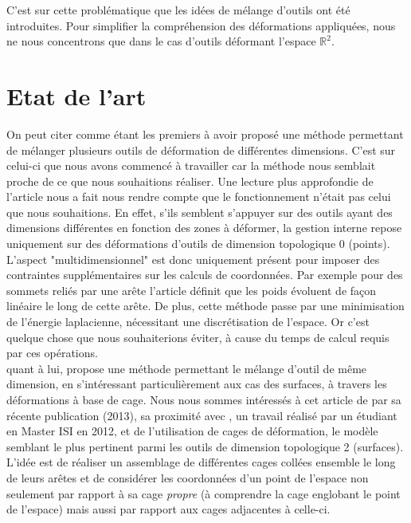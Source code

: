 C'est sur cette problématique que les idées de mélange d'outils ont
été introduites. Pour simplifier la compréhension des déformations
appliquées, nous ne nous concentrons que dans le cas d'outils
déformant l'espace $\mathbb{R}^2$.

\section{Etat de l'art}

On peut citer \cite{JBPS11} comme étant les premiers à avoir proposé
une méthode permettant de mélanger plusieurs outils de déformation de
différentes dimensions. C'est sur celui-ci que nous avons commencé à
travailler car la méthode nous semblait proche de ce que nous
souhaitions réaliser. Une lecture plus approfondie de l'article nous a
fait nous rendre compte que le fonctionnement n'était pas celui que
nous souhaitions. En effet, s'ils semblent s'appuyer sur des outils
ayant des dimensions différentes en fonction des zones à déformer, la
gestion interne repose uniquement sur des déformations d'outils de
dimension topologique 0 (points). L'aspect "multidimensionnel" est
donc uniquement présent pour imposer des contraintes supplémentaires
sur les calculs de coordonnées. Par exemple pour des sommets reliés
par une arête l'article définit que les poids évoluent de façon
linéaire le long de cette arête. De plus, cette méthode passe par une
minimisation de l'énergie laplacienne, nécessitant une discrétisation
de l'espace. Or c'est quelque chose que nous souhaiterions éviter, à
cause du temps de calcul requis par ces opérations.
\\

\cite{GPCP13} quant à lui, propose une méthode permettant le mélange
d'outil de même dimension, en s'intéressant particulièrement aux cas
des surfaces, à travers les déformations à base de cage.  Nous nous
sommes intéressés à cet article de par sa récente publication (2013),
sa proximité avec \cite{Hur12}, un travail réalisé par un étudiant en
Master ISI en 2012, et de l'utilisation de cages de déformation, le
modèle semblant le plus pertinent parmi les outils de dimension
topologique 2 (surfaces). L'idée est de réaliser un assemblage de
différentes cages collées ensemble le long de leurs arêtes et de
considérer les coordonnées d'un point de l'espace non seulement par
rapport à sa cage \textit{propre} (à comprendre la cage englobant le
point de l'espace) mais aussi par rapport aux cages adjacentes à
celle-ci.

